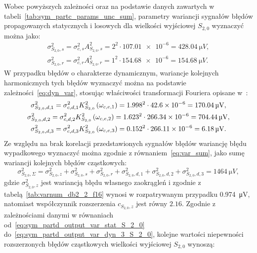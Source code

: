 Wobec powyższych zależności oraz na podstawie danych zawartych w tabeli~\ref{tab:sym_partc_params_unc_sum}, parametry wariancji sygnałów błędów propagowanych statycznych i losowych dla wielkości wyjściowej $S_{2,0}$ wyznaczyć można jako:
\begin{gather}
\sigma_{S_{2,0},s}^{2} = \sigma_{c,s}^{2} A_{S_{2,0},s}^{2} = 2^{2} \cdot \num{107.01e-6} = \qty{428.04}{\micro V} \label{eq:sym_partd_output_var_stat_S_2_0}, \\
\sigma_{S_{2,0},r}^{2} = \sigma_{c,r}^{2} A_{S_{2,0},r}^{2} = 1^{2} \cdot \num{154.68e-6} = \qty{154.68}{\micro V} \label{eq:sym_partd_output_var_rand_S_2_0}.
\end{gather}
W przypadku błędów o charakterze dynamicznym, wariancje kolejnych harmonicznych tych błędów wyznaczyć można na podstawie zależności~\eqref{eq:dyn_var}, stosując właściwości transformacji Fouriera opisane w~\cite{oppenheim_sns}:
\begin{gather}
\sigma_{S_{2,0},d,1}^{2} = \sigma_{c,d,1}^{2} K_{S_{2,0}}^{2} \left(\omega_{c,e,1}\right) = {1.998}^{2} \cdot \num{42.6e-6} = \qty{170.04}{\micro V} \label{eq:sym_partd_output_var_dyn_1_S_2_0}, \\
\sigma_{S_{2,0},d,2}^{2} = \sigma_{c,d,2}^{2} K_{S_{2,0}}^{2}\left(\omega_{c,e,2}\right) = {1.623}^{2} \cdot \num{266.34e-6} = \qty{704.44}{\micro V} \label{eq:sym_partd_output_var_dyn_2_S_2_0}, \\
\sigma_{S_{2,0},d,3}^{2} = \sigma_{c,d,3}^{2} K_{S_{2,0}}^{2} \left(\omega_{c,e,3}\right) = {0.152}^{2} \cdot \num{266.11e-6} = \qty{6.18}{\micro V} \label{eq:sym_partd_output_var_dyn_3_S_2_0}.
\end{gather}
Ze względu na brak korelacji przedstawionych sygnałów błędów wariancję błędu wypadkowego wyznaczyć można zgodnie z równaniem~\eqref{eq:var_sum}, jako sumę wariancji kolejnych błędów cząstkowych:
\begin{equation}
\sigma_{S_{2,0},\Sigma}^{2} = \sigma_{S_{2,0},z}^{2} + \sigma_{S_{2,0},s}^{2} + \sigma_{S_{2,0},r}^{2} + \sigma_{S_{2,0},d,1}^{2} + \sigma_{S_{2,0},d,2}^{2} + \sigma_{S_{2,0},d,3}^{2} = \qty{1464}{\micro V} \label{eq:sym_partd_output_var_sum_S_2_0},
\end{equation}
gdzie $\sigma_{S_{2,0},z}^{2}$ jest wariancją błędu własnego zaokrągleń i zgodnie z tabelą~\ref{tab:varnum_db2_2_f16} wynosi w rozpatrywanym przypadku \qty{0.974}{\micro V}, natomiast współczynnik rozszerzenia $c_{S_{2,0},z}$ jest równy $2.16$.
Zgodnie z zależnościami danymi w równaniach od~\eqref{eq:sym_partd_output_var_stat_S_2_0} do~\eqref{eq:sym_partd_output_var_dyn_3_S_2_0}, kolejne wartości niepewności rozszerzonych błędów cząstkowych wielkości wyjściowej $S_{2,0}$ wynoszą:
